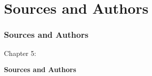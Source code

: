 %

\section{Sources and Authors}
\begin{frame}[fragile]
	\frametitle{Sources and Authors}

	\begin{center}\huge{Chapter 5:}\end{center}
	\begin{center}\huge{\color{typo3darkgrey}\textbf{Sources and Authors}}\end{center}

\end{frame}

